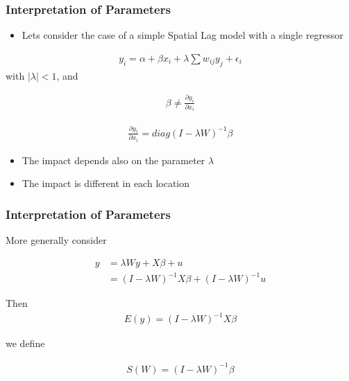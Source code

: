\documentclass[
  shownotes,
  xcolor={svgnames},
  hyperref={colorlinks,citecolor=DarkBlue,linkcolor=DarkRed,urlcolor=DarkBlue}
  , aspectratio=169]{beamer}
\begin{document}
\begin{frame}
\frametitle{Interpretation of Parameters}
\begin{itemize}
\item Lets consider the case of a simple Spatial Lag model with a single regressor
\end{itemize}

\begin{align}
y_i = \alpha + \beta x_i + \lambda \sum w_{ij} y_j + \epsilon_i
\end{align}
with $|\lambda|<1$, and 

\begin{align}
\beta \neq \frac{\partial y_i}{\partial x_{i}} \nonumber
\end{align}

\begin{align}
 \frac{\partial y_i}{\partial x_{i}} = diag(I-\lambda W)^{-1}\beta \nonumber
\end{align}
\begin{itemize}
  \item The impact depends also on the parameter $\lambda$
  \item The impact is different in each location
\end{itemize}  


\end{frame}
\begin{frame}
\frametitle{Interpretation of Parameters}
More generally consider 

\begin{align}
y&=\lambda Wy+X\beta+u \nonumber \\
 &=(I-\lambda W)^{-1}X\beta+(I-\lambda W)^{-1}u \nonumber
\end{align}

Then 
\begin{align}
E(y)=(I-\lambda W)^{-1}X\beta
\end{align}

we define

\begin{align}
S(W)=(I-\lambda W)^{-1}\beta
\end{align}
\end{frame}
\end{document}
